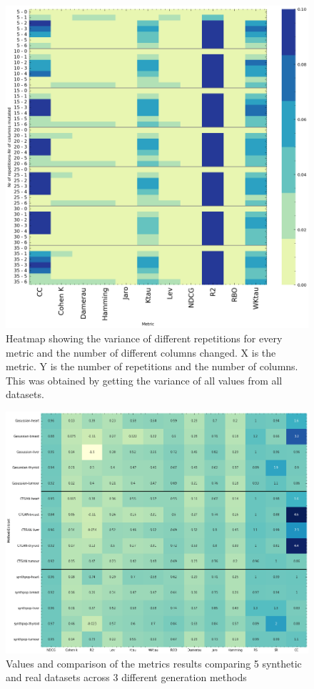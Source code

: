 \begin{figure}[htbp]
    \centering
    \caption{Heatmap showing the variance of different repetitions for every metric and the number of different columns changed. X is the metric. Y is the number of repetitions and the number of columns. This was obtained by getting the variance of all values from all datasets.  }\label{fig:nrruns} 
    \includegraphics[scale=0.70]{figures/heatmap-runs.png}
    \end{figure}


    \begin{figure}[htbp]
        \centering
        \caption{Values and comparison of the metrics results comparing 5 synthetic and real datasets across 3 different generation methods}\label{fig:synth_heat} 
       \includegraphics[scale=0.60]{figures/heatmap-synth.png}
        \end{figure}

